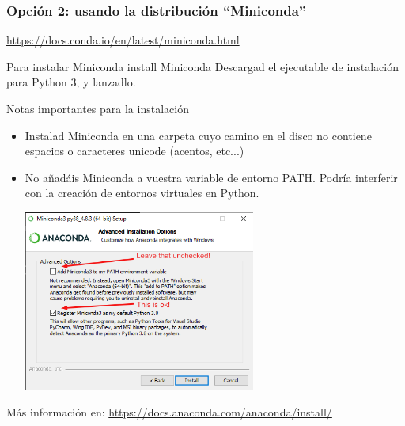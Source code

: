 \documentclass[9pt]{beamer}
\begin{document}
        \begin{frame}
            \frametitle{Opción 2: usando la distribución  ``Miniconda''}
            \begin{center}
              {\huge \href{https://docs.conda.io/en/latest/miniconda.html}{https://docs.conda.io/en/latest/miniconda.html}}
            \end{center}\medskip

            \begin{block}{Para instalar Miniconda install Miniconda}
              Descargad el ejecutable de instalación para Python 3, y lanzadlo.
              
            \end{block}
            \pause
            \begin{block}{Notas importantes para la instalación}
             \begin{itemize}
              \item Instalad  Miniconda en una carpeta cuyo camino en
                el disco no contiene espacios o caracteres unicode
                (acentos, etc...)
              \item
                No añadáis Miniconda a vuestra variable de entorno
                PATH. Podría interferir con la creación de entornos
                virtuales en Python.               
                
                \begin{center}
                  \includegraphics[width=0.6\textwidth]{Miniconda_installation_options}
                  
                \end{center}

              \end{itemize}\medskip
            \end{block}
            Más información en: \href{https://docs.anaconda.com/anaconda/install/}{https://docs.anaconda.com/anaconda/install/}
          \end{frame}
        
\end{document}
